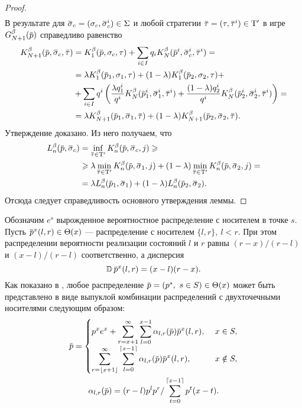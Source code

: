 {\begin{proof}
\begin{equation*}
\begin{gathered}
    \end{gathered}
  \end{equation*}
  В результате для $\sigmav_c = (\sigma_c, \sigmav_c^i) \in \Sigma$ и любой стратегии $\tauv = (\tau, \tauv^i) \in \Tau'$ в игре $\theG[N+1](\p)$ справедливо равенство
  \begin{align*}
    \K[N+1](\p, \sigmav_c, \tauv) &=
    \K[1](\p, \sigma_c, \tau) +
    \sum_{i \in I} q_i \K[N](\p^i, \sigmav^i_c, \tauv^i) =                             \\
    &= \lambda \K[1](\p_1, \sigma_1, \tau) +
    (1-\lambda) \K[1](\p_2, \sigma_2, \tau) +                                          \\
    &+ \sum_{i \in I} q^i \left(
      \frac{\lambda q^i_1}{q^i} \K[N](\p^i_1, \sigmav^i_1, \tauv^i) +
      \frac{(1-\lambda) q^i_2}{q^i} \K[N](\p^i_2, \sigmav^i_2, \tauv^i)
    \right) =                                                                          \\
    &= \lambda \K[N+1](\p_1, \sigmav_1, \tauv) +
    (1-\lambda)\K[N+1](\p_2, \sigmav_2, \tauv).
  \end{align*}
  Утверждение доказано.
  Из него получаем, что
  \begin{align*}
    \Low[n](\p, \sigmav_c)
    &= \inf_{\tauv \in \Tau'} \K[n](\p, \sigmav_c, j) \geqslant\\
    &\geqslant \lambda \min_{\tauv \in \Tau'} \K[n](\p, \sigmav_1, j) + (1-\lambda) \min_{\tauv \in \Tau'} \K[n](\p, \sigmav_2, j) =\\
    &= \lambda \Low[n](\p_1, \sigmav_1) + (1-\lambda) \Low[n](\p_2, \sigmav_2).
  \end{align*}
  Отсюда следует справедливость основного утверждения леммы.
\end{proof}

Обозначим $e^s$ вырожденное вероятностное распределение с носителем в точке $s$.
Пусть $\p^x(l, r) \in \Theta(x)$ --- распределение с носителем $\{l, r\},\ l<r$.
При этом распределении вероятности реализации состояний $l$ и $r$ равны $(r-x)/(r-l)$ и $(x-l)/(r-l)$ соответственно, а дисперсия
\[
  \D \p^x(l, r) = (x - l)(r - x).
\]
Как показано в \cite{domansky11}, любое распределение $\p = (p^s,\ s \in S) \in \Theta(x)$ может быть представлено в виде выпуклой комбинации распределений с двухточечными носителями следующим образом:
\begin{gather}
  \label{ch2:lower-bound:eq:prob-decomp-sum}
  \p = \begin{cases}
    \displaystyle
    p^x e^x + \sum_{r=x+1}^\infty \sum_{l=0}^{x-1} \alpha_{l,r}(\p) \p^x(l, r),\ & x \in S,\\
    \displaystyle
    \sum_{r=\floor{x+1}}^\infty \sum_{l=0}^{\ceil{x-1}} \alpha_{l,r}(\p) \p^x(l, r),\ & x \notin S,\\
  \end{cases}\\
  \alpha_{l,r}(\p) = (r-l) p^l p^r / \sum_{t=0}^{\ceil{x-1}} p^t (x-t). \nonumber
\end{gather}

}
